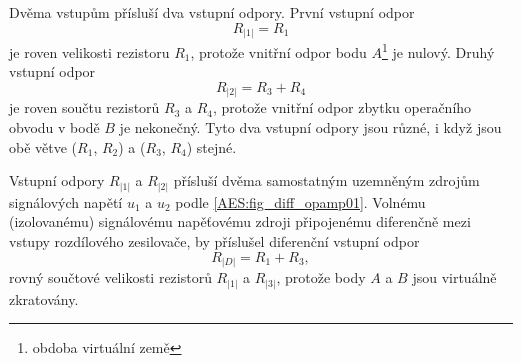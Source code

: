         Dvěma vstupům přísluší dva vstupní odpory. První vstupní odpor $$R_{|1|} = R_1$$ je roven 
        velikosti rezistoru $R_1$, protože vnitřní odpor bodu $A$\footnote{obdoba virtuální země} 
        je nulový. Druhý vstupní odpor $$R_{|2|} = R_3 + R_4$$ je roven součtu rezistorů $R_3$ a 
        $R_4$, protože vnitřní odpor zbytku operačního obvodu v bodě $B$ je nekonečný. Tyto dva 
        vstupní odpory jsou různé, i když jsou obě větve ($R_1$, $R_2$) a ($R_3$, $R_4$) stejné. 
        
        Vstupní odpory $R_{|1|}$ a $R_{|2|}$ přísluší dvěma samostatným uzemněným zdrojům 
        signálových napětí $u_1$ a $u_2$ podle \ref{AES:fig_diff_opamp01}. Volnému (izolovanému) 
        signálovému napěťovému zdroji připojenému diferenčně mezi vstupy rozdílového zesilovače, by 
        příslušel diferenční vstupní odpor $$R_{|D|} = R_1 + R_3,$$ rovný součtové velikosti 
        rezistorů $R_{|1|}$ a $R_{|3|}$, protože body $A$ a $B$ jsou virtuálně zkratovány.